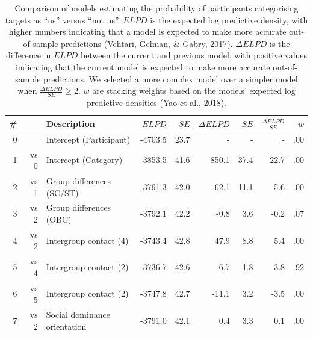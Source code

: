 \documentclass[12pt, a4paper]{article}
\begin{document}
\begin{table}
\caption{
Comparison of models estimating the probability of participants categorising targets as ``us'' versus ``not us''. $\textit{ELPD}$ is the expected log predictive density, with higher numbers indicating that a model is expected to make more accurate out-of-sample predictions (Vehtari, Gelman, \& Gabry, 2017). $\Delta\textit{ELPD}$ is the difference in $\textit{ELPD}$ between the current and previous model, with positive values indicating that the current model is expected to make more accurate out-of-sample predictions. We selected a more complex model over a simpler model when $\frac{\Delta\textit{ELPD}}{\textit{SE}} \geq 2$. $w$ are stacking weights based on the models' expected log predictive densities (Yao et al., 2018).%
}
\centering
{}
\small
\begin{tabularx}{\linewidth}{r@{~}rXrrrrrr} \toprule
\# &  & Description & $\textit{ELPD}$ & $\textit{SE}$ & $\Delta\textit{ELPD}$ & $\textit{SE}$ & $\frac{\Delta\textit{ELPD}}{\textit{SE}}$ & $w$ \\ \midrule 
0 &      & Intercept (Participant) & -4703.5 & 23.7 &     - &    - &    - & .00 \\ 
1 & vs 0 & Intercept (Category)    & -3853.5 & 41.6 & 850.1 & 37.4 & 22.7 & .00 \\
2 & vs 1 & Group differences (SC/ST)       & -3791.3 & 42.0 &  62.1 & 11.1 &  5.6 & .00 \\
3 & vs 2 & Group differences (OBC)         & -3792.1 & 42.2 &  -0.8 &  3.6 & -0.2 & .07 \\ \midrule
4 & vs 2 & Intergroup contact (4) & -3743.4 & 42.8 &  47.9 &  8.8 &  5.4 & .00 \\
5 & vs 4 & Intergroup contact (2) & -3736.7 & 42.6 &   6.7 &  1.8 &  3.8 & .92 \\
6 & vs 5 & Intergroup contact (2) & -3747.8 & 42.7 & -11.1 &  3.2 & -3.5 & .00 \\
7 & vs 2 & Social dominance orientation & -3791.0 & 42.1 &   0.4 &  3.3 &  0.1 & .00 \\
\bottomrule
\end{tabularx}
\label{tab:t2}
\end{table}
\end{document}
